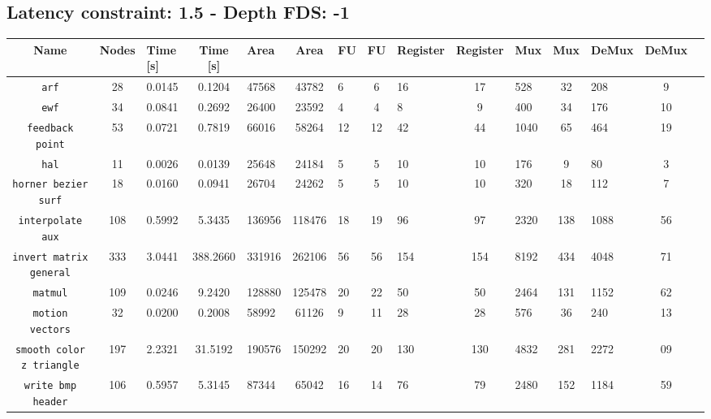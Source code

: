 \documentclass[a4paper, 11pt, oneside]{article}
\begin{document}
\begin{landscape}
\subsection{Latency constraint: 1.5 - Depth FDS: -1}
\begin{table}[!h]
  \begin{center}
  \begin{tabular}{|c|c V{3} c|g|c|g|c|g|c|g|c|g|c|g|}
    \hline
    \textbf{Name} & \textbf{Nodes} & \textbf{Time [s]} & \textbf{Time [s]} & \textbf{Area} & \textbf{Area} & \textbf{FU} & \textbf{FU} & \textbf{Register} & \textbf{Register} & \textbf{Mux} & \textbf{Mux}
    & \textbf{DeMux} & \textbf{DeMux}\\
    \hline
    \texttt{arf}										  &  28 & 0.0145 &   0.1204 &  47568 &   43782 &  6 &  6 &  16 &  17 &  528 &  32 &  208 &   9 \\ \hline
    \texttt{ewf}										  &  34 & 0.0841 &   0.2692 &  26400 &   23592 &  4 &  4 &   8 &   9 &  400 &  34 &  176 &  10 \\ \hline
    \texttt{feedback point}					  &  53 & 0.0721 &   0.7819 &  66016 &   58264 & 12 & 12 &  42 &  44 & 1040 &  65 &  464 &  19 \\ \hline
    \texttt{hal}										  &  11 & 0.0026 &   0.0139 &  25648 &   24184 &  5 &  5 &  10 &  10 &  176 &   9 &   80 &   3 \\ \hline
    \texttt{horner bezier surf}			  &  18 & 0.0160 &   0.0941 &  26704 &   24262 &  5 &  5 &  10 &  10 &  320 &  18 &  112 &   7 \\ \hline
    \texttt{interpolate aux}				  & 108 & 0.5992 &   5.3435 & 136956 &  118476 & 18 & 19 &  96 &  97 & 2320 & 138 & 1088 &  56 \\ \hline
    \texttt{invert matrix general}	  & 333 & 3.0441 & 388.2660 & 331916 &  262106 & 56 & 56 & 154 & 154 & 8192 & 434 & 4048 &  71 \\ \hline
    \texttt{matmul}									  & 109 & 0.0246 &   9.2420 & 128880 &  125478 & 20 & 22 &  50 &  50 & 2464 & 131 & 1152 &  62 \\ \hline
    \texttt{motion vectors}					  &  32 & 0.0200 &   0.2008 &  58992 &   61126 &  9 & 11 &  28 &  28 &  576 &  36 &  240 &  13 \\ \hline
    \texttt{smooth color z triangle}	& 197 & 2.2321 &  31.5192 & 190576 &  150292 & 20 & 20 & 130 & 130 & 4832 & 281 & 2272 &  09 \\ \hline
    \texttt{write bmp header}				  & 106 & 0.5957 &   5.3145 &  87344 &   65042 & 16 & 14 &  76 &  79 & 2480 & 152 & 1184 &  59 \\ \hline
  \end{tabular}
  \end{center}
\end{table}


\end{landscape}
\end{document}
